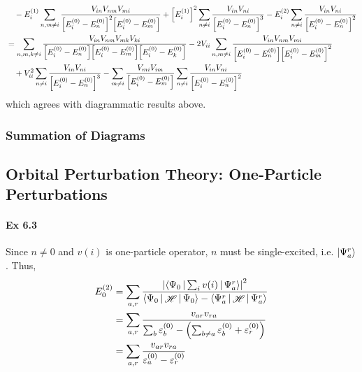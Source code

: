 \documentclass[a4paper]{article}
\DeclareMathOperator{\sH}{\mathscr{H}}
\newcommand{\ex}[1]{\paragraph{Ex #1}}
\numberwithin{equation}{subsection}
\begin{document}
\begin{align}
&{}\quad- E_i^{(1)} \sum_{n,m\neq i} \dfrac{V_{in}V_{nm}V_{mi} }{\qty[E_i^{(0)} - E_n^{(0)}]^2\qty[E_i^{(0)} - E_m^{(0)}]} 
 +  \qty[E_i^{(1)}]^2 \sum_{n\neq i} \dfrac{V_{in}V_{ni}}{\qty[E_i^{(0)} - E_n^{(0)}]^3} 
-  E_i^{(2)} \sum_{n\neq i} \dfrac{V_{in}V_{ni}}{\qty[E_i^{(0)} - E_n^{(0)}]^2} \notag\\
&= \sum_{n,m,k\neq i} \dfrac{V_{in} V_{nm}V_{mk}V_{ki}}{\qty[E_i^{(0)} - E_n^{(0)}]\qty[E_i^{(0)} - E_m^{(0)}]\qty[E_i^{(0)} - E_k^{(0)}]} 
- 2V_{ii}\sum_{n,m\neq i} \dfrac{V_{in} V_{nm} V_{mi}}{\qty[E_i^{(0)} - E_n^{(0)}]\qty[E_i^{(0)} - E_m^{(0)}]^2}  \notag\\
&{}\quad %
+  V_{ii}^2 \sum_{n\neq i} \dfrac{V_{in}V_{ni}}{\qty[E_i^{(0)} - E_n^{(0)}]^3} 
-  \sum_{m\neq i} \dfrac{V_{mi}V_{im}}{\qty[E_i^{(0)} - E_m^{(0)}]} \sum_{n\neq i} \dfrac{V_{in}V_{ni}}{\qty[E_i^{(0)} - E_n^{(0)}]^2} 
\end{align}
which agrees with diagrammatic results above.

\subsubsection{Summation of Diagrams}

\newpage
\subsection{Orbital Perturbation Theory: One-Particle Perturbations}
\ex{6.3}
Since $ n\neq 0 $ and $ v(i) $ is one-particle operator, $ n $ must be single-excited, i.e. $ \ket{\Psi_a^r} $. Thus,
\begin{align}
E_0^{(2)} &= \sum_{a,r} \dfrac{\abs{\Braket{\Psi_0 | \sum_i v(i) | \Psi_a^r}}^2}{\Braket{\Psi_0 | \sH | \Psi_0} - \Braket{\Psi_a^r| \sH | \Psi_a^r}} \notag\\
&= \sum_{a,r} \dfrac{v_{ar} v_{ra}}{\sum_b \varepsilon_b^{(0)} - \qty(\sum_{b\neq a}\varepsilon_b^{(0)} + \varepsilon_r^{(0)})} \notag\\
&= \sum_{a,r} \dfrac{v_{ar} v_{ra}}{\varepsilon_a^{(0)} - \varepsilon_r^{(0)}}
\end{align}
\end{document}
